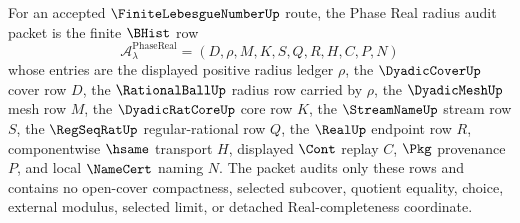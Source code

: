 \begin{definition}
\label{def:finite-lebesgue-number-phase-real-radius-audit-packet}
For an accepted $\FiniteLebesgueNumberUp$ route, the Phase Real radius audit packet is the finite $\BHist$ row
$$
\mathcal{A}_{\lambda}^{\mathrm{PhaseReal}}=(D,\rho,M,K,S,Q,R,H,C,P,N)
$$
whose entries are the displayed positive radius ledger $\rho$, the $\DyadicCoverUp$ cover row $D$, the $\RationalBallUp$ radius row carried by $\rho$, the $\DyadicMeshUp$ mesh row $M$, the $\DyadicRatCoreUp$ core row $K$, the $\StreamNameUp$ stream row $S$, the $\RegSeqRatUp$ regular-rational row $Q$, the $\RealUp$ endpoint row $R$, componentwise $\hsame$ transport $H$, displayed $\Cont$ replay $C$, $\Pkg$ provenance $P$, and local $\NameCert$ naming $N$. The packet audits only these rows and contains no open-cover compactness, selected subcover, quotient equality, choice, external modulus, selected limit, or detached Real-completeness coordinate.
\end{definition}

